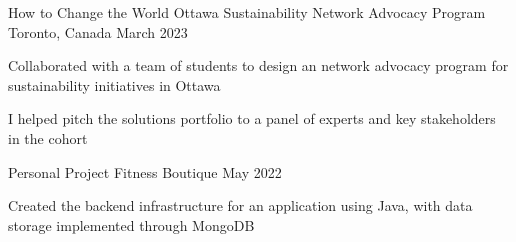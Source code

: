 \begin{cventries}
  \cventry
    {How to Change the World}
    {Ottawa Sustainability Network Advocacy Program}
    {Toronto, Canada}
    {March 2023}
    {
      \begin{cvitems}
        \item {Collaborated with a team of students to design an network advocacy program for sustainability initiatives in Ottawa
        \item I helped pitch the solutions portfolio to a panel of experts and key stakeholders in the cohort}      
        \end{cvitems}
    }
  \cventry
    {Personal Project}
    {Fitness Boutique}
    {}
    {May 2022}
    {
      \begin{cvitems}
        \item {Created the backend infrastructure for an application using Java, with data storage implemented through MongoDB}
        \end{cvitems}
    }
\end{cventries}